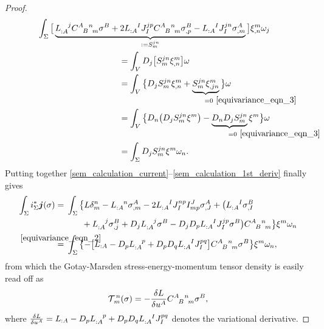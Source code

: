 \begin{proof}
\begin{equation}
\begin{multlined}
      \int_\Sigma \big\lbrack \underbrace{L_{:A}^{\hphantom{:A}j} \gmc{A}{B}{n}{m}\sigma^B + 2 L_{:A}^{\hphantom{:A}I} J_I^{jp} \gmc{A}{B}{n}{m}\sigma^B_{,p} - L_{:A}^{\hphantom{:A}I} J_I^{jn}\sigma^A_{,m}}_{\vcentcolon=S_m^{jn}}\big\rbrack \xi^m_{,n}\omega_j \\
      \begin{aligned}
        &{} = \int_V D_j \big\lbrack S_m^{jn} \xi^m_{,n}\big\rbrack \omega \\
        &{} = \int_V \big\{ D_j S_m^{jn} \xi^m_{,n} + \underbrace{S_m^{jn} \xi^m_{,jn}}_{\mathrlap{\!=0\ \eqref{equivariance_eqn_3}}}\big\}\omega\\
        &{} = \int_V \big\{ D_n\big( D_j S_m^{jn} \xi^m\big) - \underbrace{D_n D_j S_m^{jn}}_{\mathrlap{\!=0\ \eqref{equivariance_eqn_3}}} \xi^m \big\}\omega\\
        &{} = \int_\Sigma D_j S_m^{jn} \xi^m \omega_n.
      \end{aligned}
    \end{multlined}
  \end{equation}
  Putting together \eqref{sem_calculation_current}--\eqref{sem_calculation_1st_deriv} finally gives
  \begin{equation}\label{sem_last_calc}
    \begin{aligned}
      \int_\Sigma i_\Sigma^\ast\boldsymbol{j}(\sigma) &{} =\, \int_\Sigma \big\{ L\delta^n_m - L_{:A}^{\hphantom{:A}n}\sigma^A_{,m} - 2 L_{:A}^{\hphantom{:A}I}J_I^{np} I^J_{mp} \sigma^A_{,J} + \big(L_{:A}^{\hphantom{:A}I}\sigma^B_{,I} \\
                                                        &{} \hphantom{=\, \int_\Sigma\big\{} + L_{:A}^{\hphantom{:A}j}\sigma^B_{,j} + D_j L_{:A}^{\hphantom{:A}j}\sigma^B - D_j D_p L_{:A}^{\hphantom{:A}I}J_I^{jp} \sigma^B \big)\gmc{A}{B}{n}{m} \big\} \xi^m \omega_n \\
                                                        &{} \stackrel{\mathclap{\eqref{equivariance_eqn_2}}}{=}\, \int_\Sigma \big\{{-\big\lbrack} L_{:A} - D_p L_{:A}^{\hphantom{:A}p} + D_p D_q L_{:A}^{\hphantom{:A}I} J_I^{pq} \big\rbrack \gmc{A}{B}{n}{m} \sigma^B \big\} \xi^m \omega_n,
    \end{aligned}
  \end{equation}
  from which the Gotay-Marsden stress-energy-momentum tensor density is easily read off as
  \begin{equation}\label{sem_tensor_result}
    \mathcal T^{\,n}_{\,m}(\sigma) = -\frac{\delta L}{\delta u^A} \gmc{A}{B}{n}{m} \sigma^B,
  \end{equation}
  where $\frac{\delta L}{\delta u^A} =  L_{:A} - D_p L_{:A}^{\hphantom{:A}p} + D_p D_q L_{:A}^{\hphantom{:A}I} J_I^{pq}$ denotes the variational derivative. 
\end{proof}

